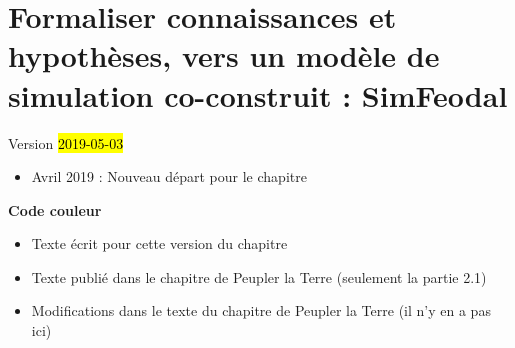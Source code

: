\chapter{Formaliser connaissances et hypothèses, vers un modèle de simulation co-construit : SimFeodal}
\label{chap:chap2}
\begin{center}
	{\large Version \hl{2019-05-03}}
\end{center}

\begin{itemize}
	\item Avril 2019 : Nouveau départ pour le chapitre
\end{itemize}
\setcounter{minitocdepth}{1}

	\minitoc


\textbf{Code couleur}
\begin{itemize}
	\item Texte écrit pour cette version du chapitre
	\item {\redroman Texte publié dans le chapitre de Peupler la Terre} (seulement la partie 2.1)
	\item {\blueroman Modifications dans le texte du chapitre de Peupler la Terre} (il n'y en a pas ici)
\end{itemize}

\clearpage

